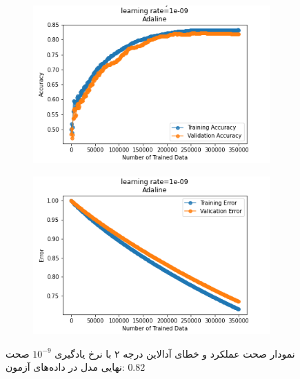 \documentclass[12pt, a4paper]{article}
\begin{document}
\begin{figure}[h]
    \begin{subfigure}{0.45\linewidth}
        \centering
        \includegraphics[width=\linewidth]{images/6/adaline/lr/acc_1e-09.png}
    \end{subfigure}
    \hfil
    \begin{subfigure}{0.45\linewidth}
        \centering
        \includegraphics[width=\linewidth]{images/6/adaline/lr/error_1e-09.png}
    \end{subfigure}
    \caption{نمودار صحت عملکرد‌ و خطای آدالاین درجه ۲ با نرخ یادگیری $10^{-9}$
    \newline
    صحت نهایی مدل در داده‌های آزمون: $0.82$}
\end{figure}
\end{document}
